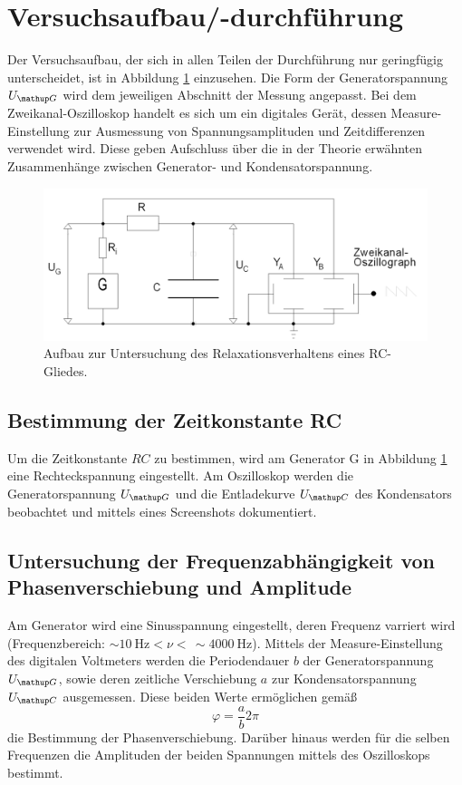 \section{Versuchsaufbau/-durchführung}
Der Versuchsaufbau, der sich in allen Teilen der Durchführung nur geringfügig unterscheidet, ist in Abbildung \ref{fig: aufbau} einzusehen. %
Die Form der Generatorspannung $U\ua{G}$ wird dem jeweiligen Abschnitt der Messung angepasst. Bei dem Zweikanal-Oszilloskop handelt es sich um ein %
digitales Gerät, dessen Measure-Einstellung zur Ausmessung von Spannungsamplituden und Zeitdifferenzen verwendet wird. Diese geben Aufschluss über
die in der Theorie erwähnten Zusammenhänge zwischen Generator- und Kondensatorspannung.
\begin{figure}
  \centering
  \includegraphics[width = \textwidth]{pics/aufbau.png}
  \caption{Aufbau zur Untersuchung des Relaxationsverhaltens eines RC-Gliedes.}
  \label{fig: aufbau}
\end{figure}

\subsection{Bestimmung der Zeitkonstante RC}
Um die Zeitkonstante $RC$ zu bestimmen, wird am Generator G in Abbildung \ref{fig: aufbau} eine Rechteckspannung eingestellt.
Am Oszilloskop werden die Generatorspannung $U\ua{G}$ und die Entladekurve $U\ua{C}$ des Kondensators beobachtet und mittels eines Screenshots %
dokumentiert.

\subsection{Untersuchung der Frequenzabhängigkeit von Phasenverschiebung und Amplitude}
Am Generator wird eine Sinusspannung eingestellt, deren Frequenz varriert wird (Frequenzbereich: $\sim\SI{10}{\hertz}<\nu<\, \sim\SI{4000}{\hertz}$). %
Mittels der Measure-Einstellung des digitalen Voltmeters werden die Periodendauer $b$ der
Generatorspannung $U\ua{G}$, sowie deren zeitliche Verschiebung $a$ zur Kondensatorspannung $U\ua{C}$ ausgemessen. Diese beiden Werte ermöglichen gemäß
\begin{equation}
  \varphi = \frac{a}{b}2\pi
  \label{eq:phasenverschiebung}
\end{equation}
die Bestimmung der Phasenverschiebung. Darüber hinaus werden für die selben Frequenzen die Amplituden der beiden Spannungen mittels des Oszilloskops
bestimmt.

